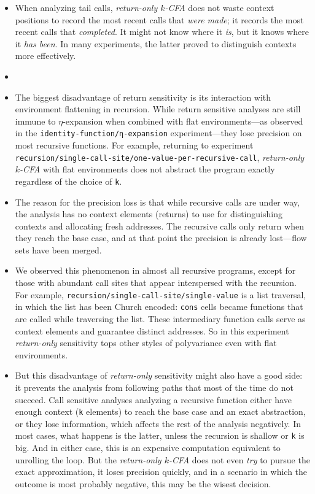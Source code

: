 \documentclass[12pt, oneside]{book}
\begin{document}
\begin{itemize}
  \item When analyzing tail calls, \emph{return-only \(k\)-CFA} does not waste context positions to record the most recent calls that \emph{were made}; it records the most recent calls that \emph{completed}. It might not know where it \emph{is}, but it knows where it \emph{has been}. In many experiments, the latter proved to distinguish contexts more effectively.
  
  \item
  
  \item The biggest disadvantage of return sensitivity is its interaction with environment flattening in recursion. While return sensitive analyses are still immune to \(η\)-expansion when combined with flat environments—as observed in the \texttt{identity-function/η-expansion} experiment—they lose precision on most recursive functions. For example, returning to experiment \texttt{recursion/single-call-site/one-value-per-recursive-call}, \emph{return-only \(k\)-CFA} with flat environments does not abstract the program exactly regardless of the choice of \texttt{k}.
  
  \item The reason for the precision loss is that while recursive calls are under way, the analysis has no context elements (returns) to use for distinguishing contexts and allocating fresh addresses. The recursive calls only return when they reach the base case, and at that point the precision is already lost—flow sets have been merged.
  
  \item We observed this phenomenon in almost all recursive programs, except for those with abundant call sites that appear interspersed with the recursion. For example, \texttt{recursion/single-call-site/single-value} is a list traversal, in which the list has been Church encoded: \texttt{cons} cells became functions that are called while traversing the list. These intermediary function calls serve as context elements and guarantee distinct addresses. So in this experiment \emph{return-only} sensitivity tops other styles of polyvariance even with flat environments.
  
  \item But this disadvantage of \emph{return-only} sensitivity might also have a good side: it prevents the analysis from following paths that most of the time do not succeed. Call sensitive analyses analyzing a recursive function either have enough context (\texttt{k} elements) to reach the base case and an exact abstraction, or they lose information, which affects the rest of the analysis negatively. In most cases, what happens is the latter, unless the recursion is shallow or \texttt{k} is big. And in either case, this is an expensive computation equivalent to unrolling the loop. But the \emph{return-only \(k\)-CFA} does not even \emph{try} to pursue the exact approximation, it loses precision quickly, and in a scenario in which the outcome is most probably negative, this may be the wisest decision.
  

\end{itemize}
\end{document}
